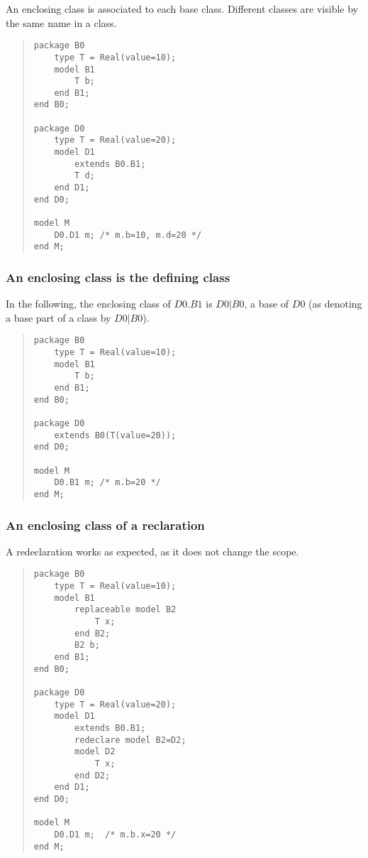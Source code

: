 \documentclass[10pt,b5paper]{article}
\begin{document}
An enclosing class is associated to each base class.  Different
classes are visible by the same name in a class.

\begin{quote}
\begin{lstlisting}[aboveskip=-\baselineskip]
package B0
    type T = Real(value=10);
    model B1
        T b;
    end B1;
end B0;

package D0
    type T = Real(value=20);
    model D1
        extends B0.B1;
        T d;
    end D1;
end D0;

model M
    D0.D1 m; /* m.b=10, m.d=20 */
end M;
\end{lstlisting}
\end{quote}

\subsubsection*{An enclosing class is the defining class}

In the following, the enclosing class of $D0.B1$ is $D0|B0$, a base of
$D0$ (as denoting a base part of a class by $D0|B0$).

\begin{quote}
\begin{lstlisting}[aboveskip=-\baselineskip]
package B0
    type T = Real(value=10);
    model B1
        T b;
    end B1;
end B0;

package D0
    extends B0(T(value=20));
end D0;

model M
    D0.B1 m; /* m.b=20 */
end M;
\end{lstlisting}
\end{quote}

\subsubsection*{An enclosing class of a reclaration}

A redeclaration works as expected, as it does not change the scope.

\begin{quote}
\begin{lstlisting}[aboveskip=-\baselineskip]
package B0
    type T = Real(value=10);
    model B1
        replaceable model B2
            T x;
        end B2;
        B2 b;
    end B1;
end B0;

package D0
    type T = Real(value=20);
    model D1
        extends B0.B1;
        redeclare model B2=D2;
        model D2
            T x;
        end D2;
    end D1;
end D0;

model M
    D0.D1 m;  /* m.b.x=20 */
end M;
\end{lstlisting}
\end{quote}
\end{document}
